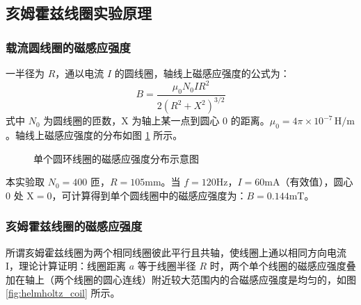 \documentclass[11pt]{article}
\begin{document}
\subsection{亥姆霍兹线圈实验原理}

\subsubsection{载流圆线圈的磁感应强度}

一半径为 $R$，通以电流 $I$ 的圆线圈，轴线上磁感应强度的公式为：
\begin{equation}
    B = \frac{\mu_0 N_0 I R^2}{2(R^2 + X^2)^{3/2}} \label{eq:single_coil_B}
\end{equation}
式中 $N_0$ 为圆线圈的匝数，$\text{X}$ 为轴上某一点到圆心 0 的距离。$\mu_0 = 4\pi \times 10^{-7} \, \text{H/m}$。轴线上磁感应强度的分布如图 \ref{fig:single_coil} 所示。

\begin{figure}[htbp]
    \centering
    \caption{单个圆环线圈的磁感应强度分布示意图}
    \label{fig:single_coil}
\end{figure}

本实验取 $N_0=400$ 匝，$R=105\text{mm}$。当 $f=120\text{Hz}$，$I=60\text{mA}$（有效值），圆心 0 处 $\text{X}=0$，可计算得到单个圆线圈中的磁感应强度为：$B=0.144\text{mT}$。

\subsubsection{亥姆霍兹线圈的磁感应强度}

所谓亥姆霍兹线圈为两个相同线圈彼此平行且共轴，使线圈上通以相同方向电流 I，理论计算证明：线圈距离 $a$ 等于线圈半径 $R$ 时，两个单个线圈的磁感应强度叠加在轴上（两个线圈的圆心连线）附近较大范围内的合磁感应强度是均匀的，如图 \ref{fig:helmholtz_coil} 所示。
\end{document}
